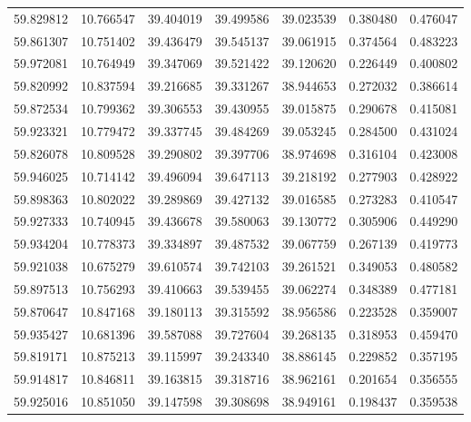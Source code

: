 \begin{tabular}{rrrrrrr}
 59.829812 &  10.766547 &         39.404019 &         39.499586 &         39.023539 &  0.380480 &  0.476047 \\
 59.861307 &  10.751402 &         39.436479 &         39.545137 &         39.061915 &  0.374564 &  0.483223 \\
 59.972081 &  10.764949 &         39.347069 &         39.521422 &         39.120620 &  0.226449 &  0.400802 \\
 59.820992 &  10.837594 &         39.216685 &         39.331267 &         38.944653 &  0.272032 &  0.386614 \\
 59.872534 &  10.799362 &         39.306553 &         39.430955 &         39.015875 &  0.290678 &  0.415081 \\
 59.923321 &  10.779472 &         39.337745 &         39.484269 &         39.053245 &  0.284500 &  0.431024 \\
 59.826078 &  10.809528 &         39.290802 &         39.397706 &         38.974698 &  0.316104 &  0.423008 \\
 59.946025 &  10.714142 &         39.496094 &         39.647113 &         39.218192 &  0.277903 &  0.428922 \\
 59.898363 &  10.802022 &         39.289869 &         39.427132 &         39.016585 &  0.273283 &  0.410547 \\
 59.927333 &  10.740945 &         39.436678 &         39.580063 &         39.130772 &  0.305906 &  0.449290 \\
 59.934204 &  10.778373 &         39.334897 &         39.487532 &         39.067759 &  0.267139 &  0.419773 \\
 59.921038 &  10.675279 &         39.610574 &         39.742103 &         39.261521 &  0.349053 &  0.480582 \\
 59.897513 &  10.756293 &         39.410663 &         39.539455 &         39.062274 &  0.348389 &  0.477181 \\
 59.870647 &  10.847168 &         39.180113 &         39.315592 &         38.956586 &  0.223528 &  0.359007 \\
 59.935427 &  10.681396 &         39.587088 &         39.727604 &         39.268135 &  0.318953 &  0.459470 \\
 59.819171 &  10.875213 &         39.115997 &         39.243340 &         38.886145 &  0.229852 &  0.357195 \\
 59.914817 &  10.846811 &         39.163815 &         39.318716 &         38.962161 &  0.201654 &  0.356555 \\
 59.925016 &  10.851050 &         39.147598 &         39.308698 &         38.949161 &  0.198437 &  0.359538 \\

\end{tabular}
